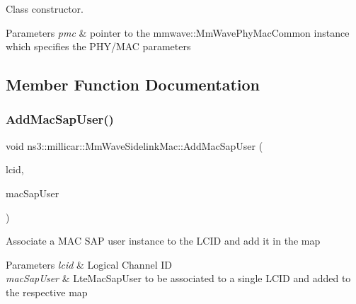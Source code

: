 Class constructor. 


\begin{DoxyParams}{Parameters}
{\em pmc} & pointer to the mmwave\+::\+Mm\+Wave\+Phy\+Mac\+Common instance which specifies the P\+H\+Y/\+M\+AC parameters \\
\hline
\end{DoxyParams}


\subsection{Member Function Documentation}
\mbox{\label{classns3_1_1millicar_1_1MmWaveSidelinkMac_ad4c32a42bd58226a3ad07828e7b4cff0}} 
\subsubsection{\texorpdfstring{Add\+Mac\+Sap\+User()}{AddMacSapUser()}}
{\footnotesize\ttfamily void ns3\+::millicar\+::\+Mm\+Wave\+Sidelink\+Mac\+::\+Add\+Mac\+Sap\+User (\begin{DoxyParamCaption}\item[{uint8\+\_\+t}]{lcid,  }\item[{Lte\+Mac\+Sap\+User $\ast$}]{mac\+Sap\+User }\end{DoxyParamCaption})}

Associate a M\+AC S\+AP user instance to the L\+C\+ID and add it in the map 
\begin{DoxyParams}{Parameters}
{\em lcid} & Logical Channel ID \\
\hline
{\em mac\+Sap\+User} & Lte\+Mac\+Sap\+User to be associated to a single L\+C\+ID and added to the respective map \\
\hline
\end{DoxyParams}
\mbox{\label{classns3_1_1millicar_1_1MmWaveSidelinkMac_af1c118a5b92dfce7a7b62c55ac50c020}} 

